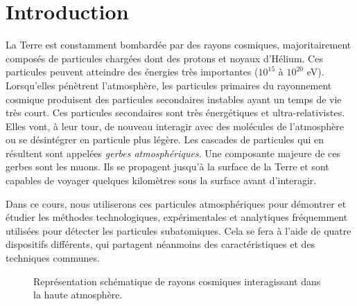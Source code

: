 \section{Introduction}
\setcounter{page}{1}

La Terre est constamment bombardée par des rayons cosmiques, majoritairement composés de particules chargées dont des protons et noyaux d'Hélium. Ces particules peuvent atteindre des énergies très importantes ($10^{15}$ à $10^{20}$ eV). Lorsqu'elles pénètrent l'atmosphère, les particules primaires du rayonnement cosmique produisent des particules secondaires instables ayant un temps de vie très court. Ces particules secondaires sont très énergétiques et ultra-relativistes. Elles vont, à leur tour, de nouveau interagir avec des molécules de l'atmosphère ou se désintégrer en particule plus légère. Les cascades de particules qui en résultent sont appelées \textit{gerbes atmosphériques}. Une composante majeure de ces gerbes sont les muons. Ils se propagent jusqu'à la surface de la Terre et sont capables de voyager quelques kilomètres sous la surface avant d'interagir.

Dans ce cours, nous utiliserons ces particules atmosphériques pour démontrer et étudier les méthodes technologiques, expérimentales et analytiques fréquemment utilisées pour détecter les particules subatomiques. Cela se fera à l'aide de quatre dispositifs différents, qui partagent néanmoins des caractéristiques et des techniques communes.

\begin{figure}[hb]
    \caption{\label{fig:CR} Représentation schématique de rayons cosmiques interagissant dans la haute atmosphère.}
\end{figure}

